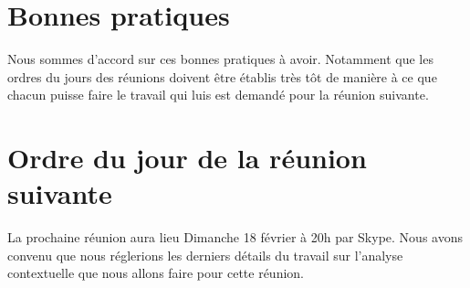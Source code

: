 \documentclass[11pt,a4paper,french,twoside,openright]{article}
\begin{document}
\section{Bonnes pratiques}
Nous sommes d'accord sur ces bonnes pratiques à avoir.
Notamment que les ordres du jours des réunions doivent être établis très tôt de manière à ce que chacun puisse faire le travail qui luis est demandé pour la réunion suivante.

\section{Ordre du jour de la réunion suivante}
La prochaine réunion aura lieu Dimanche 18 février à 20h par Skype.
Nous avons convenu que nous réglerions les derniers détails du travail sur l'analyse contextuelle que nous allons faire pour cette réunion.

\label{LastPage}
\end{document}
